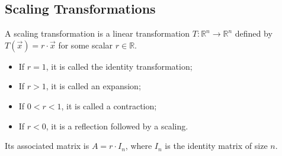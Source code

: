 \subsection{Scaling Transformations}
\begin{definition}
    A scaling transformation is a linear transformation $T: \mathbb{R}^n \to \mathbb{R}^n$ defined by $T(\vec{x}) = r \cdot \vec{x}$ for some scalar $r \in \mathbb{R}$.
    \begin{itemize}[itemsep=1pt,label=$\circ$]
        \item If $r = 1$, it is called the identity transformation;
        \item If $r > 1$, it is called an expansion;
        \item If $0 < r < 1$, it is called a contraction;
        \item If $r < 0$, it is a reflection followed by a scaling.
    \end{itemize}
    Its associated matrix is $A = r \cdot I_n$, where $I_n$ is the identity matrix of size $n$.
\end{definition}

